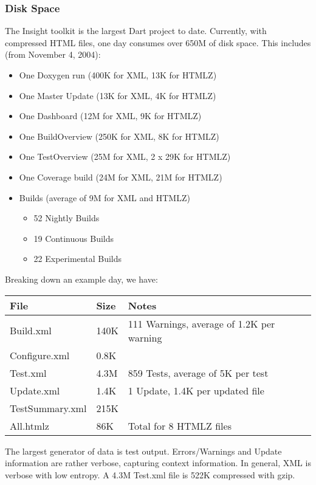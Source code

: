 \documentclass{InsightBook}
\begin{document}
\subsubsection{Disk Space}
The Insight toolkit is the largest Dart project to date.  Currently,
with compressed HTML files, one day consumes over 650M of disk space.
This includes (from November 4, 2004):
\begin{itemize}
\item One Doxygen run (400K for XML, 13K for HTMLZ)
\item One Master Update (13K for XML, 4K for HTMLZ)
\item One Dashboard (12M for XML, 9K for HTMLZ)
\item One BuildOverview (250K for XML, 8K for HTMLZ)
\item One TestOverview (25M for XML, 2 x 29K for HTMLZ)
\item One Coverage build (24M for XML, 21M for HTMLZ)
\item Builds (average of 9M for XML and HTMLZ)
\begin{itemize}
 \item 52 Nightly Builds
 \item 19 Continuous Builds
 \item 22 Experimental Builds
\end{itemize}
\end{itemize}

Breaking down an example day, we have:

\begin{centering}
\begin{tabular}{|l|l|l|}
\hline
File & Size & Notes \\
\hline
Build.xml & 140K & 111 Warnings, average of 1.2K per warning \\
Configure.xml & 0.8K & \\
Test.xml & 4.3M & 859 Tests, average of 5K per test \\
Update.xml & 1.4K & 1 Update, 1.4K per updated file \\
TestSummary.xml & 215K & \\
All.htmlz & 86K & Total for 8 HTMLZ files \\
\hline
\end{tabular}
\end{centering}

The largest generator of data is test output.  Errors/Warnings and
Update information are rather verbose, capturing context information.
In general, XML is verbose with low entropy.  A 4.3M Test.xml file
is 522K compressed with gzip.
\end{document}
